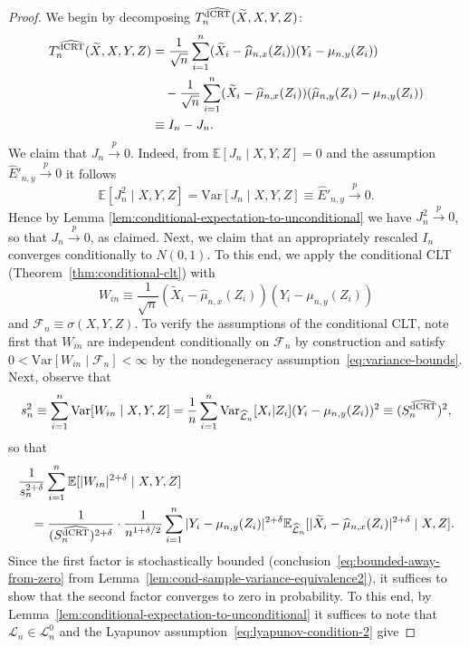 \documentclass[12pt]{article}
\theoremstyle{definition}
\theoremstyle{remark}
\newcommand{\E}{\mathbb E}								%
\newcommand{\V}{\mathrm{Var}}							%
\newcommand{\convp}{\overset p \rightarrow}             %
\newcommand{\srx}{X}									%
\newcommand{\srz}{Z}									%
\newcommand{\srxk}{\widetilde X}						%
\newcommand{\sry}{Y}									%
\newcommand{\law}{\mathcal L}							%
\newcommand{\nulllaws}{\mathscr L^0}					%
\newcommand{\lawhat}{\widehat{\mathcal L}}				%
\newcommand{\dCRThat}{\widehat{\textnormal{dCRT}}}		%
\begin{document}
\begin{proof}
We begin by decomposing $T_n^{\dCRThat}(\srxk, \srx, \sry, \srz)$:
 \begin{align}
 	T_n^{\dCRThat}(\srxk, \srx, \sry, \srz) &= \frac{1}{\sqrt n} \sum_{i = 1}^n (\srxk_i - \widehat \mu_{n,x}(\srz_i))(\sry_i - \mu_{n,y}(\srz_i)) \\
 	&\quad -\frac{1}{\sqrt n}\sum_{i = 1}^n (\srxk_i - \widehat \mu_{n,x}(\srz_i))(\widehat \mu_{n,y}(\srz_i) - \mu_{n,y}(\srz_i))\\
	&\equiv I_n - J_n.
 \end{align}
We claim that $J_n \convp 0$. Indeed, from $\E[J_n \mid \srx,\sry,\srz] = 0$ and the assumption $\widehat E'_{n, y} \convp 0$ it follows
\begin{equation*}
\E[J_n^2 \mid \srx,\sry,\srz] = \V[J_n \mid \srx,\sry,\srz] \equiv \widehat E'_{n,y} \convp 0. 
\end{equation*}
Hence by Lemma \ref{lem:conditional-expectation-to-unconditional} we have $J_n^2 \convp 0$, so that $J_n \convp 0$, as claimed. Next, we claim that an appropriately rescaled $I_n$ converges conditionally to $N(0,1)$. To this end, we apply the conditional CLT (Theorem~\ref{thm:conditional-clt}) with
 \begin{equation}
 	W_{in} \equiv \frac{1}{\sqrt{n}}(\srxk_i - \widehat \mu_{n,x}(\srz_i))(\sry_i - \mu_{n,y}(\srz_i))
 \end{equation}
 and $\mathcal{F}_n \equiv \sigma(\srx,\sry,\srz)$. To verify the assumptions of the conditional CLT, note first that $W_{in}$ are independent conditionally on $\mathcal F_n$ by construction and satisfy $0 < \V[W_{in} \mid \mathcal F_n] < \infty$ by the nondegeneracy assumption~\eqref{eq:variance-bounds}. Next, observe that
 \begin{equation*}
	s^2_n \equiv \sum_{i = 1}^n \V[W_{in}\mid \srx,\sry,\srz] =  \frac{1}{n}\sum_{i = 1}^n \V_{\lawhat_n}[\srx_i|\srz_i](\sry_i - \mu_{n,y}(\srz_i))^2 \equiv(S_n^{\dCRThat})^2,
 \end{equation*}
so that
\begin{align*}
	&\frac{1}{s_n^{2+\delta}} \sum_{i = 1}^n \E[|W_{in}|^{2+\delta} \mid \srx,\sry,\srz] \\
	&\quad= \frac{1}{(S_n^{\dCRThat})^{2+\delta}} \cdot \frac{1}{n^{1+\delta/2}} \sum_{i=1}^n |\sry_i-\mu_{n,y}(\srz_i)|^{2+\delta}\E_{\lawhat_n}[|\srxk_i-\widehat\mu_{n,x}(\srz_i)|^{2+\delta}\mid \srx,\srz].
\end{align*}
Since the first factor is stochastically bounded (conclusion~\ref{eq:bounded-away-from-zero} from Lemma~\ref{lem:cond-sample-variance-equivalence2}), it suffices to show that the second factor converges to zero in probability. To this end, by Lemma~\ref{lem:conditional-expectation-to-unconditional} it suffices to note that $\law_n \in \nulllaws_n$ and the Lyapunov assumption~\eqref{eq:lyapunov-condition-2} give

\end{proof}
\end{document}
